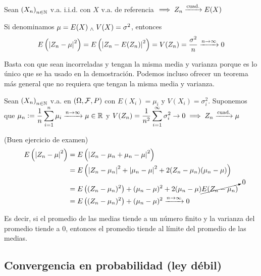 \begin{teo}
	Sean $\left(X_n\right)_{n\in \mathbb{N}}$ v.a. i.i.d. con $X$ v.a. de referencia $\displaystyle \implies Z_n\xrightarrow{\text{cuad.}} E(X)$
	\begin{dem}
		Si denominamos $\mu = E(X) \; _{\wedge} \; V(X) = \sigma^2$, entonces
		\[E\left(\left|Z_n - \mu\right|^2\right) = E\left(\left|Z_n - E(Z_n)\right|^2\right) = V(Z_n) = \frac{\sigma^2}{n} \xrightarrow{n\to\infty} 0\]
	\end{dem}
\end{teo}

Basta con que sean incorreladas y tengan la misma media y varianza porque es lo único que se ha usado en la demostración. Podemos incluso ofrecer un teorema más general que no requiera que tengan la misma media y varianza.

\begin{teo}
	Sean $\left(X_n\right)_{n\in \mathbb{N}}$ v.a. en $(\Omega, \mathcal{F}, P)$ con $E(X_i) = \mu_i$ y $V(X_i) = \sigma_i^2$. Suponemos que $\displaystyle \mu_n \vcentcolon= \frac{1}{n}\sum_{i=1}^{n} \mu_i \xrightarrow{n\to\infty} \mu \in \mathbb{R}$ y $\displaystyle V(Z_n) = \frac{1}{n^2}\sum_{i=1}^{\infty} \sigma_i^2 \to 0 \implies Z_n \xrightarrow{\text{cuad.}} \mu$
	\begin{dem} (Buen ejercicio de examen)%
		\[\begin{aligned}
				E\left(\left|Z_n - \mu\right|^2\right) & = E\left(\left|Z_n - \mu_n + \mu_n - \mu\right|^2\right)                                                \\
				                                & = E\left(\left|Z_n - \mu_n\right|^2 + \left|\mu_n - \mu\right|^2 + 2(Z_n - \mu_n)(\mu_n - \mu)\right)          \\
				                                & = E\left((Z_n - \mu_n)^2\right) + {(\mu_n - \mu)^2} + 2(\mu_n - \mu)\cancelto{0}{E(Z_n - \mu_n)} \\
				                                & = E\left((Z_n - \mu_n)^2\right) + (\mu_n - \mu)^2 \xrightarrow{n\to\infty} 0
			\end{aligned}\]
	\end{dem}
\end{teo}

Es decir, si el promedio de las medias tiende a un número finito y la varianza del promedio tiende a 0, entonces el promedio tiende al límite del promedio de las medias.


\subsection{Convergencia en probabilidad (ley débil)}

